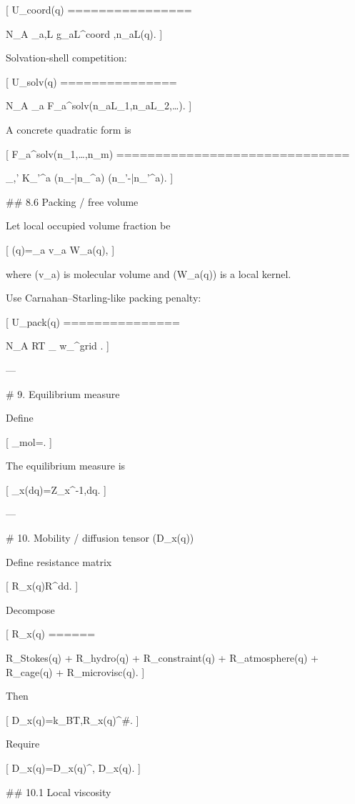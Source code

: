 [
U_{\rm coord}(q)
================

N_A
\sum_{a,L}
\Delta g_{aL}^{\rm coord}
,n_{aL}(q).
]

Solvation-shell competition:

[
U_{\rm solv}(q)
===============

N_A
\sum_a
F_a^{\rm solv}(n_{aL_1},n_{aL_2},\ldots).
]

A concrete quadratic form is

[
F_a^{\rm solv}(n_1,\ldots,n_m)
==============================

\sum_{\ell,\ell'}
K_{\ell\ell'}^a
(n_\ell-\bar n_\ell^a)
(n_{\ell'}-\bar n_{\ell'}^a).
]

## 8.6 Packing / free volume

Let local occupied volume fraction be

[
\varphi(q)=\sum_a v_a W_a(q),
]

where (v_a) is molecular volume and (W_a(q)) is a local kernel.

Use Carnahan–Starling-like packing penalty:

[
U_{\rm pack}(q)
===============

N_A RT
\sum_\ell
w_\ell^{\rm grid}
.
]

---

# 9. Equilibrium measure

Define

[
\beta_{\rm mol}=.
]

The equilibrium measure is

[
\mu_x(\mathrm dq)=Z_x^{-1},\mathrm dq.
]

---

# 10. Mobility / diffusion tensor (D_x(q))

Define resistance matrix

[
R_x(q)\in\mathbb R^{d\times d}.
]

Decompose

[
R_x(q)
======

R_{\rm Stokes}(q)
+
R_{\rm hydro}(q)
+
R_{\rm constraint}(q)
+
R_{\rm atmosphere}(q)
+
R_{\rm cage}(q)
+
R_{\rm microvisc}(q).
]

Then

[
D_x(q)=k_BT,R_x(q)^#.
]

Require

[
D_x(q)=D_x(q)^\top,
\qquad
D_x(q).
]

## 10.1 Local viscosity

